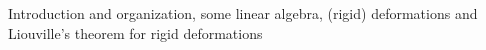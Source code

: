 Introduction and organization, some linear algebra, (rigid) deformations and Liouville's theorem for rigid deformations